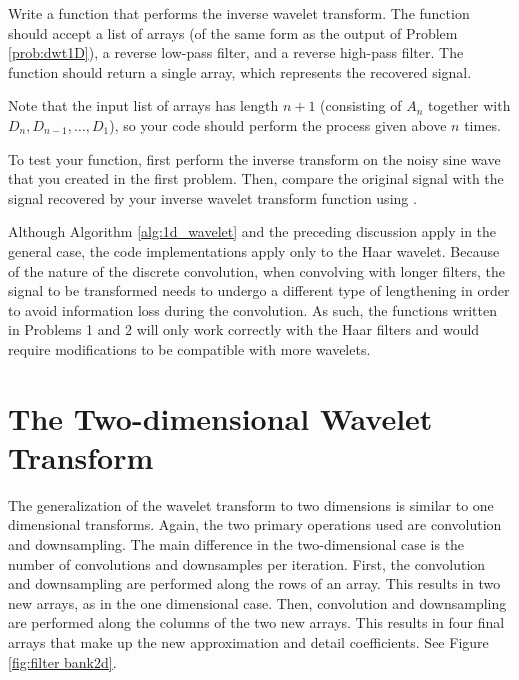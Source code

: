 \begin{problem} %
Write a function that performs the inverse wavelet transform.
The function should accept a list of arrays (of the same form as the output of Problem \ref{prob:dwt1D}), a reverse low-pass filter, and a reverse high-pass filter.
The function should return a single array, which represents the recovered signal.

Note that the input list of arrays has length $n+1$ (consisting of $A_n$ together with $D_n, D_{n-1}, \ldots, D_1$), so your code should perform the process given above $n$ times.

To test your function, first perform the inverse transform on the noisy sine wave that you created in the first problem.
Then, compare the original signal with the signal recovered by your inverse wavelet transform function using .
\end{problem}

\begin{warn}
Although Algorithm \ref{alg:1d_wavelet} and the preceding discussion apply in the general case, the code implementations apply only to the Haar wavelet.
Because of the nature of the discrete convolution, when convolving with longer filters, the signal to be transformed needs to undergo a different type of lengthening in order to avoid
information loss during the convolution.
As such, the functions written in Problems 1 and 2 will only work correctly with the Haar filters and would require modifications to be compatible with more wavelets.
\end{warn}



\section*{The Two-dimensional Wavelet Transform} %

The generalization of the wavelet transform to two dimensions is similar to one dimensional transforms.
Again, the two primary operations used are convolution and downsampling.
The main difference in the two-dimensional case is the number of convolutions and downsamples per iteration.
First, the convolution and downsampling are performed along the rows of an array.
This results in two new arrays, as in the one dimensional case.
Then, convolution and downsampling are performed along the columns of the two new arrays.
This results in four final arrays that make up the new approximation and detail coefficients.
See Figure \ref{fig:filter bank2d}.

